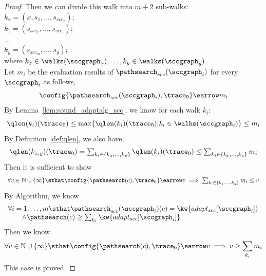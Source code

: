 \begin{proof}
Then we can divide this walk into $m+2$ sub-walks:
\\
$k_x = (x, s_1, \ldots, s_{scc_x})$;
\\
$k_1 = (s_{scc_x}, \ldots, s_{scc_1})$;
\\
$\ldots$
\\
$k_y = (s_{scc_m}, \ldots, s_y)$;
\\
where $k_x \in \walks(\sccgraph_x), \ldots, k_y \in \walks(\sccgraph_y)$.
\\
Let $m_i$ be the evaluation results of $\pathsearch_{scc}(\sccgraph_i)$ for every $\sccgraph_i$ as follows,
\[
  \config{\pathsearch_{scc}(\sccgraph_i), \trace_0} \earrow m_i
\]
By Lemma~\ref{lem:sound_adaptalg_scc}, we know for each walk $k_i$:
\[ \qlen(k_i)(\trace_0) \leq \max\{\qlen(k_i)(\trace_0) | k_i \in \walks(\sccgraph_i)\} \leq m_i \]
%
By Definition~\ref{def:qlen},  we also have,
\[ 
  \begin{array}{l}
  \qlen(k_{x,y})(\trace_0) = \sum_{k_i \in \{k_x, \ldots, k_y\}} \qlen(k_i)(\trace_0)
  \leq 
  \sum_{k_i \in \{k_x, \ldots, k_y\}} m_i
  \end{array}
  \]
Then it is sufficient to show
\[
  \begin{array}{l}
    \forall v \in \mathbb{N} \cup \{ \infty \} \sthat
  \config{\pathsearch(c), \trace_0} \earrow v 
  \implies
  \sum_{k_i \in \{k_x, \ldots, k_y\}} m_i \leq v
\end{array}
  \]
By Algorithm, we know 
\[
  \begin{array}{l}
    \forall i = 1, \ldots, m \sthat
  \pathsearch_{scc}(\sccgraph_i)(c) = \kw{adapt_{scc}[\sccgraph_i]}
  \\ \qquad
  \land 
  \pathsearch(c) \geq \sum_{k_i} \kw{adapt_{scc}[\sccgraph_i]}
\end{array}
\]
Then we know
\[
  \forall v \in \mathbb{N} \cup \{ \infty \} \sthat
  \config{\pathsearch(c), \trace_0} \earrow v
  \implies v \geq \sum_{k_i} m_i
\]
This case is proved.
\end{proof}

